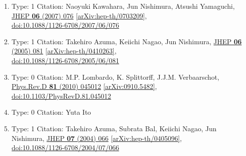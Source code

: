 \documentclass[a4paper,10pt]{article}
\begin{document}
\begin{enumerate}
\begin{enumerate}
  \item Type: 1 Citation: Naoyuki Kawahara, Jun Nishimura, Atsushi Yamaguchi, \href{https://www.doi.org/10.1088/1126-6708/2007/06/076}{JHEP {\bf 06} (2007) 076}  \href{https://arxiv.org/abs/hep-th/0703209}{[arXiv:hep-th/0703209]},\\\href{https://www.doi.org/10.1088/1126-6708/2007/06/076}{doi:10.1088/1126-6708/2007/06/076}
  \item Type: 1 Citation: Takehiro Azuma, Keiichi Nagao, Jun Nishimura, \href{https://www.doi.org/10.1088/1126-6708/2005/06/081}{JHEP {\bf 06} (2005) 081}  \href{https://arxiv.org/abs/hep-th/0410263}{[arXiv:hep-th/0410263]},\\\href{https://www.doi.org/10.1088/1126-6708/2005/06/081}{doi:10.1088/1126-6708/2005/06/081}
  \item Type: 0 Citation: M.P. Lombardo, K. Splittorff, J.J.M. Verbaarschot, \href{https://www.doi.org/10.1103/PhysRevD.81.045012}{Phys.Rev.D {\bf 81} (2010) 045012}  \href{https://arxiv.org/abs/0910.5482}{[arXiv:0910.5482]},\\\href{https://www.doi.org/10.1103/PhysRevD.81.045012}{doi:10.1103/PhysRevD.81.045012}
  \item Type: 0 Citation: Yuta Ito
  \item Type: 1 Citation: Takehiro Azuma, Subrata Bal, Keiichi Nagao, Jun Nishimura, \href{https://www.doi.org/10.1088/1126-6708/2004/07/066}{JHEP {\bf 07} (2004) 066}  \href{https://arxiv.org/abs/hep-th/0405096}{[arXiv:hep-th/0405096]},\\\href{https://www.doi.org/10.1088/1126-6708/2004/07/066}{doi:10.1088/1126-6708/2004/07/066}

\end{enumerate}
\end{enumerate}
\end{document}
